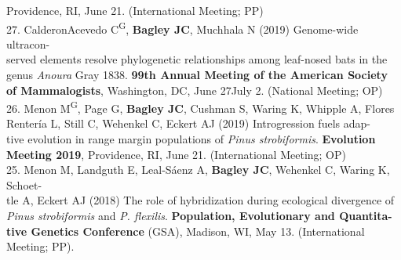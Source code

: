 \documentclass[margin,line]{res}
\begin{document}
\begin{resume}
\hspace*{8mm}Providence, RI, June 21. (International Meeting; PP) \\
27. Calderon\textendash Acevedo C\textsuperscript{G}, \textbf{Bagley JC}, Muchhala N (2019) Genome-wide ultracon-\\
\hspace*{8mm} served elements resolve phylogenetic relationships among leaf-nosed bats in the\\
\hspace*{8mm} genus \emph{Anoura} Gray 1838. \textbf{99th Annual Meeting of the American Society}\\ \vspace{2mm}
\hspace*{8mm}\textbf{of Mammalogists}, Washington, DC, June 27\textendash July 2. (National Meeting; OP)\\ 
26. Menon M\textsuperscript{G}, Page G, \textbf{Bagley JC}, Cushman S, Waring K, Whipple A, Flores\textendash \\
\hspace*{8mm} Renter\'{i}a L, Still C, Wehenkel C, Eckert AJ (2019) Introgression fuels adap-\\
\hspace*{8mm} tive evolution in range margin populations of \emph{Pinus strobiformis}. \textbf{Evolution} \\ \vspace{2mm}
\hspace*{8mm}\textbf{Meeting 2019}, Providence, RI, June 21. (International Meeting; OP) \\
25. Menon M, Landguth E, Leal-S\'{a}enz A, \textbf{Bagley JC}, Wehenkel C, Waring K, Schoet-\\
\hspace*{8mm} tle A, Eckert AJ (2018) The role of hybridization during ecological divergence of \\
\hspace*{8mm} \textit{Pinus strobiformis} and \textit{P. flexilis}. \textbf{Population, Evolutionary and Quantita-}\\
\hspace*{8mm} \textbf{tive Genetics Conference} (GSA), Madison, WI, May 13. (International\\ \vspace{2mm}
\hspace*{8mm}Meeting; PP). \\

\end{resume}
\end{document}
